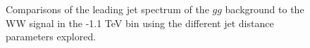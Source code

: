 \begin{figure}
\begin{center}
\caption{Comparisons of the leading jet \pt spectrum of the $gg$
  background to the WW signal in the -1.1 TeV bin using the
  different \antikt jet distance parameters explored.}
\label{fig:pt1000_basics}
\end{center}
\end{figure}





